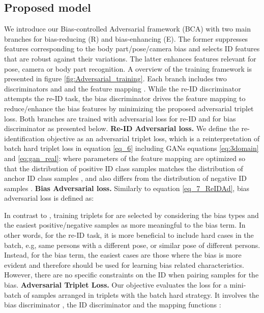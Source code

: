 \documentclass[10pt,twocolumn,letterpaper]{article}
\begin{document}
\subsection{Proposed model}
We introduce our Bias-controlled Adversarial framework (BCA) with two main branches for bias-reducing (R) and bias-enhancing (E). The former suppresses features corresponding to the body part/pose/camera bias and selects ID features that are robust against their variations. The latter enhances features relevant for pose, camera or body part recognition.
A overview of the training framework is presented in figure \ref{fig:Adversarial_training}.
Each branch includes two discriminators  and  and the feature mapping . While the re-ID discriminator  attempts the re-ID task, the bias discriminator  drives the feature mapping  to reduce/enhance the bias features by minimizing the proposed adversarial triplet loss.
Both branches are trained with adversarial loss for re-ID and for bias discriminator as presented below.\newline
{\noindent\textbf{Re-ID Adversarial loss.}} We define the re-identification objective  as an adversarial triplet loss, which is a reinterpretation of batch hard triplet loss in equation \ref{eq_6} including GANs equations \ref{eq:3domain} and \ref{eq:gan_real}:{ }
where parameters of the feature mapping  are optimized so that the distribution of positive ID class samples  matches the distribution of anchor ID class samples , and also differs from the distribution of negative ID samples . \newline
\noindent\textbf{Bias Adversarial loss.} 
Similarly to equation \ref{eq_7_ReIDAd}, bias adversarial loss is defined as:
{

}
In contrast to  , training  triplets  for  are selected by considering the bias types and the easiest positive/negative samples as more meaningful to the bias term. In other words, for the re-ID task, it is more beneficial to include hard cases in the batch, e.g, same persons with a different pose, or similar pose of different persons. Instead, for the bias term, the easiest cases are those where the bias is more evident and therefore should be used for learning bias related characteristics.
However, there are no specific constraints on the ID when pairing samples for the bias. {\noindent\textbf{Adversarial Triplet Loss.}}
Our objective evaluates the loss for a mini-batch of samples  arranged in triplets with the batch hard strategy. It involves the bias discriminator , the ID discriminator  and the mapping functions : 
\end{document}
